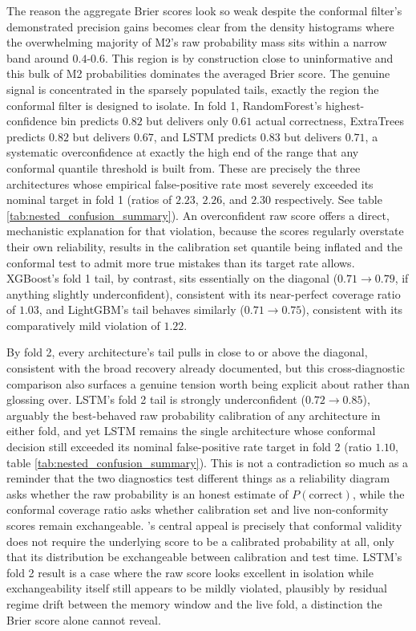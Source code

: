\documentclass[12pt, a4paper]{article}
\begin{document}
The reason the aggregate Brier scores look so weak despite the conformal filter's demonstrated precision gains becomes clear from the density histograms where the overwhelming 
majority of M2's raw probability mass sits within a narrow band around $0.4$-$0.6$. This region is by construction close to uninformative and this bulk of M2 probabilities 
dominates the averaged Brier score. The genuine signal is concentrated in the sparsely populated tails, exactly the region the conformal filter is 
designed to isolate. In fold 1, RandomForest's highest-confidence bin predicts $0.82$ but delivers only $0.61$ actual correctness, ExtraTrees predicts $0.82$ but 
delivers $0.67$, and LSTM predicts $0.83$ but delivers $0.71$, a systematic overconfidence at exactly the high end of the range that any conformal quantile threshold is built 
from. These are precisely the three architectures whose empirical false-positive rate most severely exceeded its nominal target in fold 1 (ratios of $2.23$, $2.26$, and $2.30$ 
respectively. See table \ref{tab:nested_confusion_summary}). An overconfident raw score offers a direct, mechanistic explanation for that violation, because the scores regularly 
overstate their own reliability, results in the calibration set quantile being inflated and the conformal test to admit more true mistakes than its target rate allows. 
XGBoost's fold 1 tail, by contrast, sits essentially on the diagonal ($0.71 \to 0.79$, if anything slightly underconfident), consistent with its near-perfect coverage ratio of 
$1.03$, and LightGBM's tail behaves similarly ($0.71 \to 0.75$), consistent with its comparatively mild violation of $1.22$.

\medskip

By fold 2, every architecture's tail pulls in close to or above the diagonal, consistent with the broad recovery already documented, but this cross-diagnostic comparison also 
surfaces a genuine tension worth being explicit about rather than glossing over. LSTM's fold 2 tail is strongly underconfident ($0.72 \to 0.85$), arguably the best-behaved raw 
probability calibration of any architecture in either fold, and yet LSTM remains the single architecture whose conformal decision still exceeded its nominal false-positive rate 
target in fold 2 (ratio $1.10$, table \ref{tab:nested_confusion_summary}). This is not a contradiction so much as a reminder that the two diagnostics test different things as a 
reliability diagram asks whether the raw probability is an honest estimate of $P(\text{correct})$, while the conformal coverage ratio asks whether calibration set and live 
non-conformity scores remain exchangeable. 
\textcite[377 ff.]{shafer_tutorial_2008}'s central appeal is precisely that conformal validity does not require the underlying score to be a 
calibrated probability at all, only that its distribution be exchangeable between calibration and test time. LSTM's fold 2 result is a case where the raw score looks excellent 
in isolation while exchangeability itself still appears to be mildly violated, plausibly by residual regime drift between the memory window and the live fold, a distinction the 
Brier score alone cannot reveal.
\end{document}
